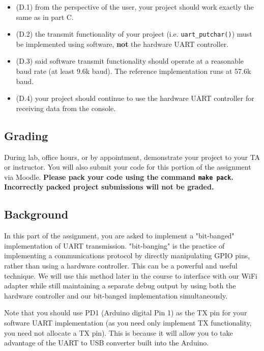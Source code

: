 \documentclass{article}
\begin{document}
\begin{itemize}

	\item (D.1) from the perspective of the user, your project should work
		exactly the same as in part C.

	\item (D.2) the transmit functionality of your project (i.e.
		\texttt{uart\_putchar()}) must be implemented using software,
		\textbf{not} the hardware UART controller.

	\item (D.3) said software transmit functionality should operate at a
		reasonable baud rate (at least 9.6k baud). The reference
		implementation runs at 57.6k baud.

	\item (D.4) your project should continue to use the hardware UART
		controller for receiving data from the console.

\end{itemize}

\subsection{Grading}

During lab, office hours, or by appointment, demonstrate your project to your
TA or instructor.  You will also submit your code for this portion of the
assignment via Moodle.  \textbf{Please pack your code using the command
\texttt{make pack}.  Incorrectly packed project submissions will not be
graded.}

\subsection{Background}

In this part of the assignment, you are asked to implement a "bit-banged"
implementation of UART transmission. "bit-banging" is the practice of
implementing a communications protocol by directly manipulating GPIO pins,
rather than using a hardware controller. This can be a powerful and useful
technique. We will use this method later in the course to interface with our
WiFi adapter while still maintaining a separate debug output by using both the
hardware controller and our bit-banged implementation simultaneously.

Note that you should use PD1 (Arduino digital Pin 1) as the TX pin for your
software UART implementation (as you need only implement TX functionality, you
need not allocate a TX pin). This is because it will allow you to take
advantage of the UART to USB converter built into the Arduino.
\end{document}
